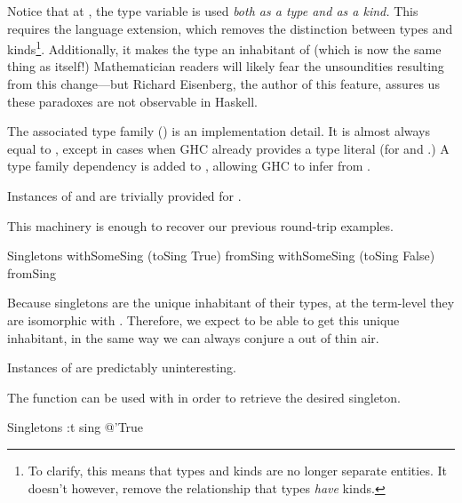 \documentclass[book.tex]{subfiles}
\begin{document}

Notice that at , the type variable  is used \emph{both as a type
and as a kind.} This requires the  \label{type in type}
 language extension, which removes the distinction between
types and kinds\footnote{To clarify, this means that types and kinds are no
longer separate entities. It doesn't however, remove the relationship that types
\emph{have} kinds.}. Additionally, it makes the type  an inhabitant of
 (which is now the same thing as  itself!) Mathematician
readers will likely fear the unsoundities resulting from this change---but
Richard Eisenberg, the author of this feature, assures us these paradoxes are
not observable in Haskell.

The associated type family  () is an implementation detail.
It is almost always equal to , except in cases when GHC already provides a
type literal (for  and .) A type family dependency is
added to , allowing GHC to infer  from .

Instances of  and  are trivially provided for .


This machinery is enough to recover our previous round-trip examples.

\begin{dorepl}{Singletons}
withSomeSing (toSing True) fromSing
withSomeSing (toSing False) fromSing
\end{dorepl}

Because singletons are the unique inhabitant of their types, at the term-level
they are isomorphic with \ty{()}. Therefore, we expect to be able to get this
unique inhabitant, in the same way we can always conjure a \ty{()} out of thin
air.


Instances of  are predictably uninteresting.


The  function can be used with  in order to
retrieve the desired singleton.

\begin{dorepl}{Singletons}
:t sing @'True
\end{dorepl}
\end{document}
